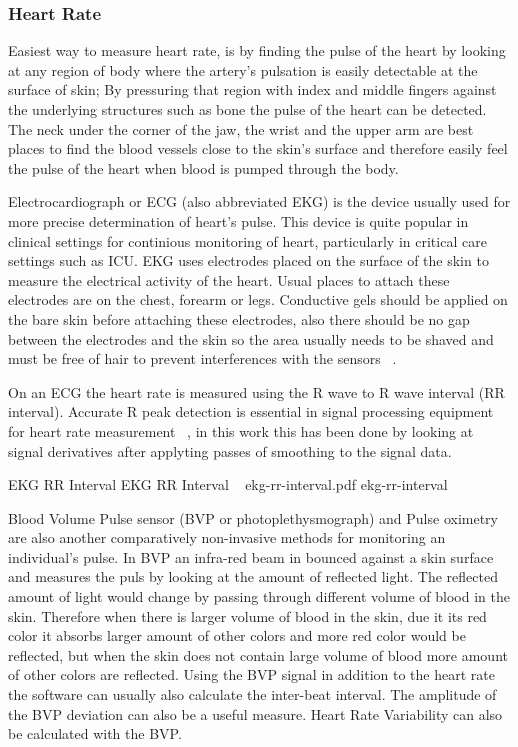 \subsubsection{Heart Rate}
Easiest way to measure heart rate, is by finding the pulse of the heart by looking at any region of body where the artery's pulsation is easily detectable at the surface of skin; By pressuring that region with index and middle fingers against the underlying structures such as bone the pulse of the heart can be detected. The neck under the corner of the jaw, the wrist and the upper arm are best places to find the blood vessels close to the skin's surface and therefore easily feel the pulse of the heart when blood is pumped through the body.

Electrocardiograph or ECG (also abbreviated EKG) is the device usually used for more precise determination of heart's pulse. This device is quite popular in clinical settings for continious monitoring of heart, particularly in critical care settings such as ICU. EKG uses electrodes placed on the surface of the skin to measure the electrical activity of the heart. Usual places to attach these electrodes are on the chest, forearm or legs. Conductive gels should be applied on the bare skin before attaching these electrodes, also there should be no gap between the electrodes and the skin so the area usually needs to be shaved and must be free of hair to prevent interferences with the sensors ~\cite{stern2001psychophysiological}.

On an ECG the heart rate is measured using the R wave to R wave interval (RR interval). Accurate R peak detection is essential in signal processing equipment for heart rate measurement ~\cite{pise2011thinkquest}, in this work this has been done by looking at signal derivatives after applyting passes of smoothing to the signal data.

\img
{EKG RR Interval}
{EKG RR Interval ~\cite{wiki2014bvp}}
{ekg-rr-interval.pdf}
{ekg-rr-interval}

Blood Volume Pulse sensor (BVP or photoplethysmograph) and Pulse oximetry are also another comparatively non-invasive methods for monitoring an individual's pulse. In BVP an infra-red beam in bounced against a skin surface and measures the puls by looking at the amount of reflected light. The reflected amount of light would change by passing through different volume of blood in the skin. Therefore when there is larger volume of blood in the skin, due it its red color it absorbs larger amount of other colors and more red color would be reflected, but when the skin does not contain large volume of blood more amount of other colors are reflected. Using the BVP signal in addition to the heart rate the software can usually also calculate the inter-beat interval. The amplitude of the BVP deviation can also be a useful measure. Heart Rate Variability can also be calculated with the BVP.

